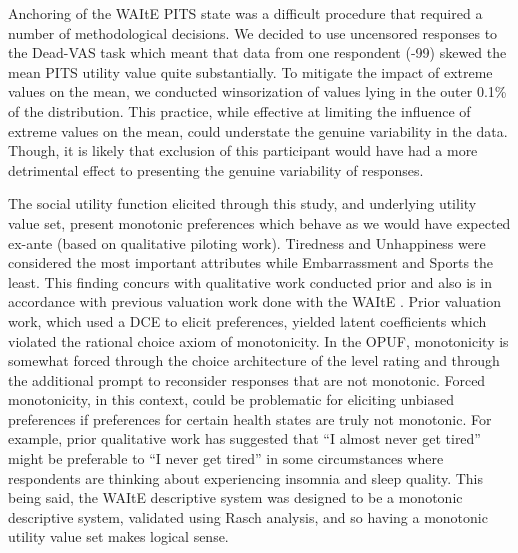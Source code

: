 \documentclass[
  number,
  preprint]{elsarticle}
\begin{document}
Anchoring of the WAItE PITS state was a difficult procedure that
required a number of methodological decisions. We decided to use
uncensored responses to the Dead-VAS task which meant that data from one
respondent (-99) skewed the mean PITS utility value quite substantially.
To mitigate the impact of extreme values on the mean, we conducted
winsorization of values lying in the outer 0.1\% of the distribution.
This practice, while effective at limiting the influence of extreme
values on the mean, could understate the genuine variability in the
data. Though, it is likely that exclusion of this participant would have
had a more detrimental effect to presenting the genuine variability of
responses.

The social utility function elicited through this study, and underlying
utility value set, present monotonic preferences which behave as we
would have expected ex-ante (based on qualitative piloting work).
Tiredness and Unhappiness were considered the most important attributes
while Embarrassment and Sports the least. This finding concurs with
qualitative work conducted prior and also is in accordance with previous
valuation work done with the WAItE \citep{Robinson2024AUKValue}. Prior
valuation work, which used a DCE to elicit preferences, yielded latent
coefficients which violated the rational choice axiom of monotonicity.
In the OPUF, monotonicity is somewhat forced through the choice
architecture of the level rating and through the additional prompt to
reconsider responses that are not monotonic. Forced monotonicity, in
this context, could be problematic for eliciting unbiased preferences if
preferences for certain health states are truly not monotonic. For
example, prior qualitative work has suggested that ``I almost never get
tired'' might be preferable to ``I never get tired'' in some
circumstances where respondents are thinking about experiencing insomnia
and sleep quality. This being said, the WAItE descriptive system was
designed to be a monotonic descriptive system, validated using Rasch
analysis, and so having a monotonic utility value set makes logical
sense.
\end{document}
